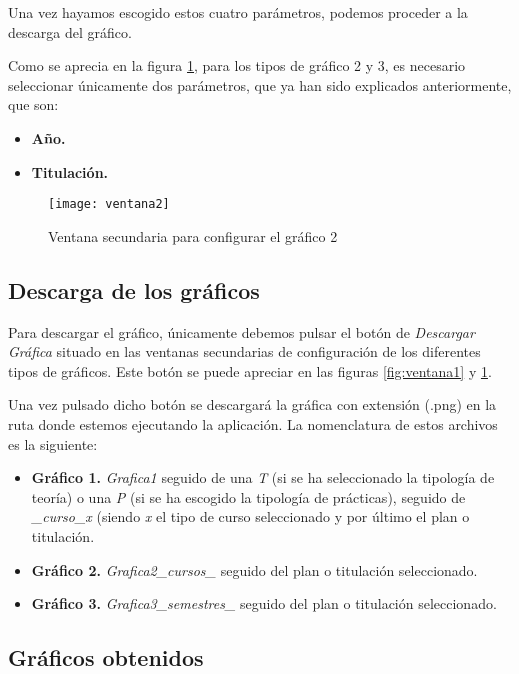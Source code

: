 Una vez hayamos escogido estos cuatro parámetros, podemos proceder a la descarga del gráfico.


Como se aprecia en la figura \ref{fig:ventana2}, para los tipos de gráfico 2 y 3, es necesario seleccionar únicamente dos parámetros, que ya han sido explicados anteriormente, que son:

\begin{itemize}
\item \textbf{Año.}
\item \textbf{Titulación.}
\end{itemize}
  
\begin{figure}%
		\centering
		\texttt{[image: ventana2]}
		\caption{Ventana secundaria para configurar el gráfico 2}\label{fig:ventana2}
	\end{figure}
	
	
\subsection{Descarga de los gráficos}

Para descargar el gráfico, únicamente debemos pulsar el botón de \emph{Descargar Gráfica} situado en las ventanas secundarias de configuración de los diferentes tipos de gráficos. Este botón se puede apreciar en las figuras \ref{fig:ventana1} y \ref{fig:ventana2}.

Una vez pulsado dicho botón se descargará la gráfica con extensión (.png) en la ruta donde estemos ejecutando la aplicación.
La nomenclatura de estos archivos es la siguiente:
 
\begin{itemize}
\item \textbf{Gráfico 1.} \emph{Grafica1} seguido de una \emph{T} (si se ha seleccionado la tipología de teoría) o una \emph{P} (si se ha escogido la tipología de prácticas), seguido de \emph{\_curso\_x} (siendo \emph{x} el tipo de curso seleccionado y por último el plan o titulación.
\item \textbf{Gráfico 2.} \emph{Grafica2\_cursos\_} seguido del plan o titulación seleccionado.
\item \textbf{Gráfico 3.} \emph{Grafica3\_semestres\_} seguido del plan o titulación seleccionado.
\end{itemize}



\subsection{Gráficos obtenidos}

